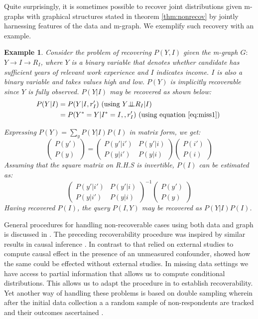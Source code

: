 \documentclass[12pt]{article}
\newcommand{\compos}{\mbox{$\bot\!\!\!\bot$}}
\newtheorem{example}{Example}
\begin{document}
Quite surprisingly, it is sometimes possible to recover joint distributions given m-graphs with graphical structures stated in theorem \ref{thm:nonrecov} by jointly harnessing features of the data and m-graph. We exemplify such recovery with an example.
\begin{example}
	Consider the problem of recovering $P(Y,I)$ given the m-graph $G:$ $Y \to I \to R_I$, where $Y$ is a binary variable that denotes whether candidate has sufficient years of relevant work experience and $I$ indicates income. $I$ is also a binary variable and takes values high and low. $P(Y)$ is implicitly recoverable since $Y$ is fully observed.   $P(Y|I)$ may be recovered as shown below:
	\begin{align*}
	P(Y|I) & = P(Y|I,r'_I)\mbox{ (using $ Y \compos R_I|I$)} \nonumber \\
	&= P(Y^*=Y|I^*=I,,r'_I) \mbox{ (using equation \ref{eq:miss1})
	}
	\end{align*}
	
	Expressing $P(Y)=\sum_y P(Y|I)P(I)$ in matrix form, we get:\\
	\[ \left( \begin{array}{c}
	P(y') \\
	P(y)
	\end{array} \right)=
	\left( \begin{array}{cc}
	P(y'|i') & P(y'|i)\\
	P(y|i') & P(y|i)
	\end{array} \right)
	\left( \begin{array}{c}
	P(i') \\
	P(i)
	\end{array} \right)
	\]
	Assuming that the square matrix on R.H.S is invertible, $P(I)$ can be estimated as: \[\left( \begin{array}{cc}
	P(y'|i') & P(y'|i)\\
	P(y|i') & P(y|i)
	\end{array} \right)^{-1} \left( \begin{array}{c}
	P(y') \\
	P(y)
	\end{array} \right) \]
	Having recovered $P(I)$, the query $P(I,Y)$ may be recovered as $P(Y|I)P(I)$. 
	\label{ex:matrix}
\end{example}
General procedures for handling non-recoverable cases using both data and graph is discussed in \cite{mohan18handling}. The preceding recoverability procedure was inspired by similar results in causal inference \citep{pearl:09-r350, kuroki2014measurement}. In contrast to \cite{pearl:09-r350} that relied on external studies to compute causal effect in the presence of an unmeasured confounder, \cite{kuroki2014measurement} showed how the same could be effected without external studies. In missing data settings we have access to partial information that allows us to compute conditional distributions. This allows us to adapt the procedure in  \cite{pearl:09-r350} to establish recoverability. Yet another way of handling  these problems is based on double sampling wherein after the initial data collection a a random sample of non-respondents are tracked and their outcomes ascertained \citep{holmes2018estimated,zhang2016nonrespondent}. 
\end{document}
